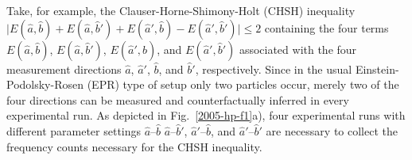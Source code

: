 \documentclass[pra,amsfonts,showpacs,preprint,showkeys]{revtex4}
\begin{document}
Take, for example, the Clauser-Horne-Shimony-Holt (CHSH) inequality
$
\vert
E({\hat a} ,{\hat b} )+
E({\hat a} ,{\hat b} ' )+
E({\hat a}' ,{\hat b} )-
E({\hat a} ',{\hat b} ')
\vert
\le 2
$
containing the four terms
$E({\hat a} ,{\hat b} )$,
$E({\hat a} ,{\hat b} ' )$,
$E({\hat a}' ,{\hat b} )$, and
$E({\hat a} ',{\hat b} ')$
associated with the four measurement directions
${\hat a}$,
${\hat a}'$,
${\hat b}$, and
${\hat b}'$, respectively.
Since in the usual Einstein-Podolsky-Rosen (EPR) type of setup
only two particles occur, merely two of the four directions can be measured and counterfactually
inferred in every experimental run.
As depicted in Fig.~\ref{2005-hp-f1}a),
four experimental runs with different parameter settings
${\hat a}$--${\hat b} $
${\hat a}$--${\hat b} ' $,
${\hat a}'$--${\hat b} $, and
${\hat a} '$--${\hat b} '$
are necessary to collect
the frequency counts necessary for the CHSH inequality.
\end{document}
